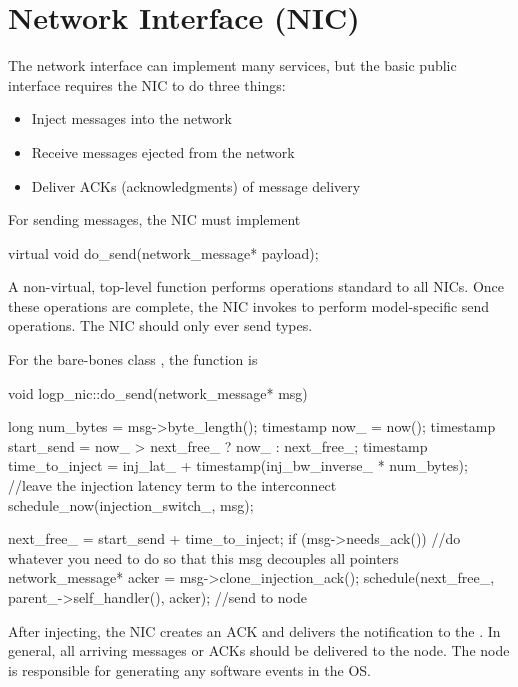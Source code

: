 \section{Network Interface (NIC)}\label{sec:nic}
The network interface can implement many services, but the basic public interface requires the NIC to do three things:

\begin{itemize}
\item Inject messages into the network
\item Receive messages ejected from the network
\item Deliver ACKs (acknowledgments) of message delivery
\end{itemize}

For sending messages, the NIC must implement

\begin{CppCode}
  virtual void do_send(network_message* payload);
\end{CppCode}
A non-virtual, top-level  function performs operations standard to all NICs.
Once these operations are complete, the NIC invokes  to perform model-specific send operations.
The NIC should only ever send  types.

For the bare-bones class , the function is

\begin{CppCode}
void logp_nic::do_send(network_message* msg)
{
  long num_bytes = msg->byte_length();
  timestamp now_ = now();
  timestamp start_send = now_ > next_free_ ? now_ : next_free_;
  timestamp time_to_inject = inj_lat_ + timestamp(inj_bw_inverse_ * num_bytes);
  //leave the injection latency term to the interconnect
  schedule_now(injection_switch_, msg);

  next_free_ = start_send + time_to_inject;
  if (msg->needs_ack()) {
    //do whatever you need to do so that this msg decouples all pointers
    network_message* acker = msg->clone_injection_ack();
    schedule(next_free_, parent_->self_handler(), acker); //send to node
  }
}
\end{CppCode}
After injecting, the NIC creates an ACK and delivers the notification to the \nodecls.
In general, all arriving messages or ACKs should be delivered to the node.
The node is responsible for generating any software events in the OS.

